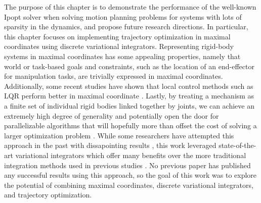\documentclass[../root.tex]{subfiles}
\begin{document}

The purpose of this chapter is to demonstrate the performance of the well-known Ipopt solver
when solving motion planning problems for systems with lots of sparsity in the dynamics,
and propose future research directions. 
In particular, this chapter focuses on implementing trajectory optimization in maximal 
coordinates using discrete variational integrators. Representing rigid-body systems in 
maximal coordinates has some appealing properties, namely that world or task-based goals 
and constraints, such as the location of an end-effector for manipulation tasks, are 
trivially expressed in maximal coordinates. Additionally, some recent studies have shown
that local control methods such as LQR perform better in maximal coordinate
\cite{brudigam_LinearTime_2020,brudigam_LinearQuadratic_2021}.  Lastly, by treating a 
mechanism as a finite set of individual rigid bodies linked together by joints, we can 
achieve an extremely high degree of generality and potentially open the door for 
parallelizable algorithms that will hopefully more than offset the cost of solving a larger
optimization problem \cite{baraff_Lineartime_1996}. While some researchers have attempted 
this approach in the past with
dissapointing results \cite{knemeyer_Minor_2020a}, this work leveraged state-of-the-art 
variational integrators 
which offer many benefits over the more traditional integration methods used in previous 
studies
\cite{manchester_Variational_2017,brudigam_LinearTime_2020,marsden_Discrete_2001a}.
No previous paper has published any successful results using this approach, so 
the goal of this work was to explore the potential of combining maximal coordinates, 
discrete variational integrators, and trajectory optimization.
\end{document}
